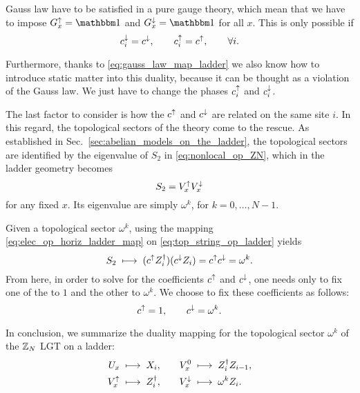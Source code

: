 Gauss law have to be satisfied in a pure gauge theory, which mean that we have to impose $G^\uparrow_x = \identity$ and $G^\downarrow_x = \identity$ for all $x$.
This is only possible if
\begin{equation}
    c^{\downarrow}_i = c^{\downarrow}, \qquad
    c^{\uparrow}_i = c^{\uparrow}, \qquad
    \forall i.
\end{equation}

Furthermore, thanks to \eqref{eq:gauss_law_map_ladder}  we also know how to introduce static matter into this duality, because it can be thought as a violation of the Gauss law.
We just have to change the phases $c^{\uparrow}_i$ and $c^{\downarrow}_i$.

The last factor to consider is how the $c^{\uparrow}$ and $c^{\downarrow}$ are related on the same site $i$.
In this regard, the topological sectors of the theory come to the rescue.
As established in Sec.~\ref{sec:abelian_models_on_the_ladder}, the topological sectors are identified by the eigenvalue of $S_2$ in \eqref{eq:nonlocal_op_ZN}, which in the ladder geometry becomes
\begin{equation}
    S_2 = V^{\uparrow}_x V^{\downarrow}_x
    \label{eq:top_string_op_ladder}
\end{equation}
for any fixed $x$.
Its eigenvalue are simply $\omega^k$, for $k = 0, \dots, N-1$.

Given a topological sector $\omega^k$, using the mapping \eqref{eq:elec_op_horiz_ladder_map} on \eqref{eq:top_string_op_ladder} yields
\begin{equation}
    S_2 \; \longmapsto \; ( c^{\uparrow} Z^\dagger_i ) ( c^{\downarrow} Z_i ) = c^{\uparrow} c^{\downarrow} = \omega^k.
\end{equation}
From here, in order to solve for the coefficients $c^{\uparrow}$ and $c^{\downarrow}$, one needs only to fix one of the to $1$ and the other to $\omega^k$.
We choose to fix these coefficients as follows:
\begin{equation}
    c^{\uparrow} = 1, \qquad
    c^{\downarrow} = \omega^k.
\end{equation}

In conclusion, we summarize the duality mapping for the topological sector $\omega^k$ of the $\mathbb{Z}_N$ LGT on a ladder:
\begin{equation}
    \begin{aligned}
        U_x      & \; \longmapsto \; X_i, \quad &
        V^0_x    & \; \longmapsto \; Z^\dagger_i Z_{i-1}, \\
        V^{\uparrow}_x   & \; \longmapsto \; Z_i^\dagger, \quad &
        V^{\downarrow}_x & \; \longmapsto \; \omega^k Z_i.
    \end{aligned}
    \label{eq:ladder_duality}
\end{equation}

